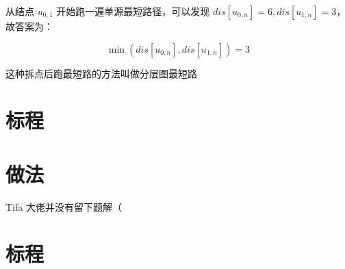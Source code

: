\documentclass{../cpct/ctsol}
\begin{document}
从结点 $u_{0,1}$ 开始跑一遍单源最短路径，可以发现 $dis[u_{0,n}]=6,dis[u_{1,n}]=3$，故答案为：

$$\min(dis[u_{0,n}],dis[u_{1,n}])=3$$

这种拆点后跑最短路的方法叫做分层图最短路

\clearpage
\section*{标程}


\makesolution
\section*{做法}

Tifa 大佬并没有留下题解（

\section*{标程}

\end{document}
